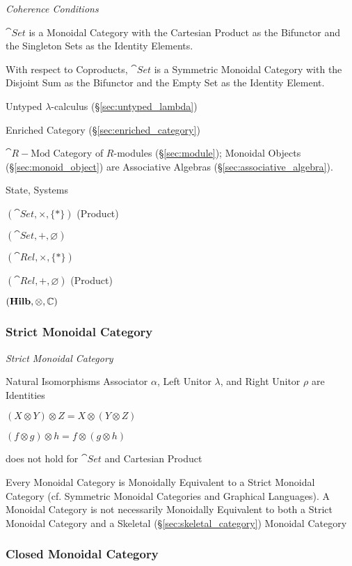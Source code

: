 \emph{Coherence Conditions}

$\cat{Set}$ is a Monoidal Category with the Cartesian Product as
the Bifunctor and the Singleton Sets as the Identity Elements.

With respect to Coproducts, $\cat{Set}$ is a Symmetric Monoidal
Category with the Disjoint Sum as the Bifunctor and the Empty
Set as the Identity Element.

Untyped $\lambda$-calculus (\S\ref{sec:untyped_lambda})

Enriched Category (\S\ref{sec:enriched_category})

$\cat{R-\text{Mod}}$ Category of $R$-modules (\S\ref{sec:module});
Monoidal Objects (\S\ref{sec:monoid_object}) are Associative Algebras
(\S\ref{sec:associative_algebra}).

State, Systems %

$(\cat{Set}, \times, \{*\})$ (Product)

$(\cat{Set}, +, \varnothing)$

$(\cat{Rel}, \times, \{*\})$

$(\cat{Rel}, +, \varnothing)$ (Product)

$(\mathbf{Hilb}, \otimes, \mathbb{C})$



\subsubsection{Strict Monoidal Category}\label{sec:strict_monoidal}

\emph{Strict Monoidal Category}

Natural Isomorphisms Associator $\alpha$, Left Unitor $\lambda$, and
Right Unitor $\rho$ are Identities

$(X \otimes Y) \otimes Z = X \otimes (Y \otimes Z)$

$(f \otimes g) \otimes h = f \otimes (g \otimes h)$

does not hold for $\cat{Set}$ and Cartesian Product

Every Monoidal Category is Monoidally Equivalent to a Strict Monoidal
Category (cf. Symmetric Monoidal Categories and Graphical Languages).
A Monoidal Category is not necessarily Monoidally Equivalent to both a
Strict Monoidal Category and a Skeletal
(\S\ref{sec:skeletal_category}) Monoidal Category



\subsubsection{Closed Monoidal Category}\label{sec:closed_monoidal}

